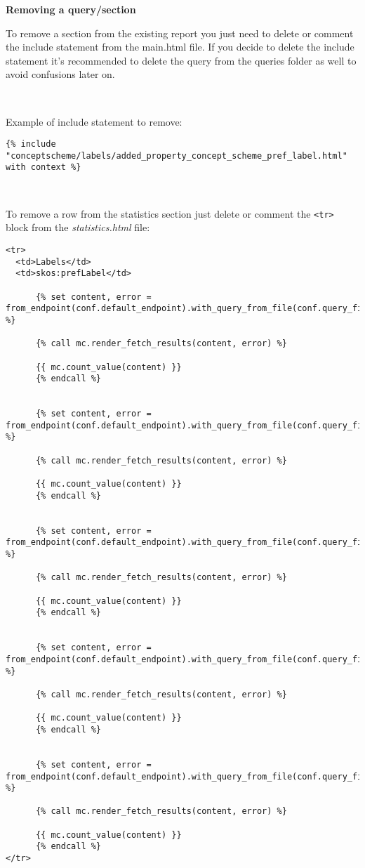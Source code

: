 \textbf{Removing a query/section}

To remove a section from the existing report you just need to delete or comment the include statement from the main.html file. If you decide to delete the include statement it's recommended to delete the query from the queries folder as well to avoid confusions later on.

~
~

Example of include statement to remove:
\begin{lstlisting}
{% include "conceptscheme/labels/added_property_concept_scheme_pref_label.html" with context %}
\end{lstlisting}

~

To remove a row from the statistics section just delete or comment the \texttt{<tr>} block from the \textit{statistics.html} file:
\begin{lstlisting}
<tr>
  <td>Labels</td>
  <td>skos:prefLabel</td>
  
      {% set content, error = from_endpoint(conf.default_endpoint).with_query_from_file(conf.query_files["count_added_property_concept_scheme_pref_label.rq"]).fetch_tabular() %}
      
      {% call mc.render_fetch_results(content, error) %}

      {{ mc.count_value(content) }}
      {% endcall %}
      
  
      {% set content, error = from_endpoint(conf.default_endpoint).with_query_from_file(conf.query_files["count_deleted_property_concept_scheme_pref_label.rq"]).fetch_tabular() %}
      
      {% call mc.render_fetch_results(content, error) %}

      {{ mc.count_value(content) }}
      {% endcall %}
      
  
      {% set content, error = from_endpoint(conf.default_endpoint).with_query_from_file(conf.query_files["count_updated_property_concept_scheme_pref_label.rq"]).fetch_tabular() %}
      
      {% call mc.render_fetch_results(content, error) %}

      {{ mc.count_value(content) }}
      {% endcall %}
      
  
      {% set content, error = from_endpoint(conf.default_endpoint).with_query_from_file(conf.query_files["count_moved_property_concept_scheme_pref_label.rq"]).fetch_tabular() %}
      
      {% call mc.render_fetch_results(content, error) %}

      {{ mc.count_value(content) }}
      {% endcall %}
      
  
      {% set content, error = from_endpoint(conf.default_endpoint).with_query_from_file(conf.query_files["count_changed_property_concept_scheme_pref_label.rq"]).fetch_tabular() %}
      
      {% call mc.render_fetch_results(content, error) %}

      {{ mc.count_value(content) }}
      {% endcall %}
</tr>
\end{lstlisting}

